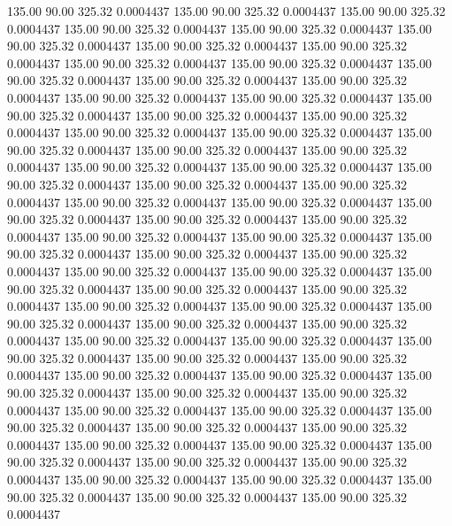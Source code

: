  135.00   90.00  325.32   0.0004437
 135.00   90.00  325.32   0.0004437
 135.00   90.00  325.32   0.0004437
 135.00   90.00  325.32   0.0004437
 135.00   90.00  325.32   0.0004437
 135.00   90.00  325.32   0.0004437
 135.00   90.00  325.32   0.0004437
 135.00   90.00  325.32   0.0004437
 135.00   90.00  325.32   0.0004437
 135.00   90.00  325.32   0.0004437
 135.00   90.00  325.32   0.0004437
 135.00   90.00  325.32   0.0004437
 135.00   90.00  325.32   0.0004437
 135.00   90.00  325.32   0.0004437
 135.00   90.00  325.32   0.0004437
 135.00   90.00  325.32   0.0004437
 135.00   90.00  325.32   0.0004437
 135.00   90.00  325.32   0.0004437
 135.00   90.00  325.32   0.0004437
 135.00   90.00  325.32   0.0004437
 135.00   90.00  325.32   0.0004437
 135.00   90.00  325.32   0.0004437
 135.00   90.00  325.32   0.0004437
 135.00   90.00  325.32   0.0004437
 135.00   90.00  325.32   0.0004437
 135.00   90.00  325.32   0.0004437
 135.00   90.00  325.32   0.0004437
 135.00   90.00  325.32   0.0004437
 135.00   90.00  325.32   0.0004437
 135.00   90.00  325.32   0.0004437
 135.00   90.00  325.32   0.0004437
 135.00   90.00  325.32   0.0004437
 135.00   90.00  325.32   0.0004437
 135.00   90.00  325.32   0.0004437
 135.00   90.00  325.32   0.0004437
 135.00   90.00  325.32   0.0004437
 135.00   90.00  325.32   0.0004437
 135.00   90.00  325.32   0.0004437
 135.00   90.00  325.32   0.0004437
 135.00   90.00  325.32   0.0004437
 135.00   90.00  325.32   0.0004437
 135.00   90.00  325.32   0.0004437
 135.00   90.00  325.32   0.0004437
 135.00   90.00  325.32   0.0004437
 135.00   90.00  325.32   0.0004437
 135.00   90.00  325.32   0.0004437
 135.00   90.00  325.32   0.0004437
 135.00   90.00  325.32   0.0004437
 135.00   90.00  325.32   0.0004437
 135.00   90.00  325.32   0.0004437
 135.00   90.00  325.32   0.0004437
 135.00   90.00  325.32   0.0004437
 135.00   90.00  325.32   0.0004437
 135.00   90.00  325.32   0.0004437
 135.00   90.00  325.32   0.0004437
 135.00   90.00  325.32   0.0004437
 135.00   90.00  325.32   0.0004437
 135.00   90.00  325.32   0.0004437
 135.00   90.00  325.32   0.0004437
 135.00   90.00  325.32   0.0004437
 135.00   90.00  325.32   0.0004437
 135.00   90.00  325.32   0.0004437
 135.00   90.00  325.32   0.0004437
 135.00   90.00  325.32   0.0004437
 135.00   90.00  325.32   0.0004437
 135.00   90.00  325.32   0.0004437
 135.00   90.00  325.32   0.0004437
 135.00   90.00  325.32   0.0004437
 135.00   90.00  325.32   0.0004437
 135.00   90.00  325.32   0.0004437
 135.00   90.00  325.32   0.0004437
 135.00   90.00  325.32   0.0004437
 135.00   90.00  325.32   0.0004437
